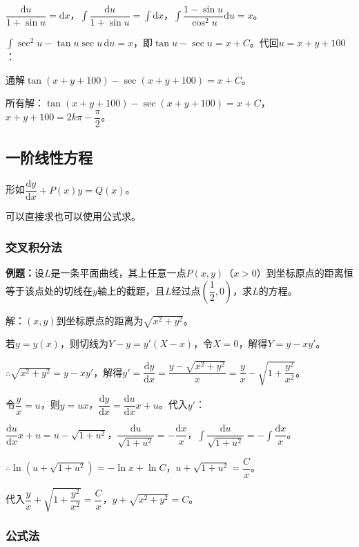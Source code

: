 \documentclass[UTF8, 12pt]{ctexart}
\begin{document}
$\dfrac{\textrm{d}u}{1+\sin u}=\textrm{d}x$，$\displaystyle{\int\dfrac{\textrm{d}u}{1+\sin u}}=\int\textrm{d}x$，$\displaystyle{\int\dfrac{1-\sin u}{\cos^2u}}\textrm{d}u=x$。

$\int\sec^2u-\tan u\sec u\,\textrm{d}u=x$，即$\tan u-\sec u=x+C$。代回$u=x+y+100$：

通解$\tan(x+y+100)-\sec(x+y+100)=x+C$。

所有解：$\tan(x+y+100)-\sec(x+y+100)=x+C$，$x+y+100=2k\pi-\dfrac{\pi}{2}$。

\subsection{一阶线性方程}

形如$\dfrac{\textrm{d}y}{\textrm{d}x}+P(x)y=Q(x)$。

可以直接求也可以使用公式求。

\subsubsection{交叉积分法}

\textbf{例题：}设$L$是一条平面曲线，其上任意一点$P(x,y)$（$x>0$）到坐标原点的距离恒等于该点处的切线在$y$轴上的截距，且$L$经过点$\left(\dfrac{1}{2},0\right)$，求$L$的方程。

解：$(x,y)$到坐标原点的距离为$\sqrt{x^2+y^2}$。

若$y=y(x)$，则切线为$Y-y=y'(X-x)$，令$X=0$，解得$Y=y-xy'$。

$\therefore\sqrt{x^2+y^2}=y-xy'$，解得$y'=\dfrac{\textrm{d}y}{\textrm{d}x}=\dfrac{y-\sqrt{x^2+y^2}}{x}=\dfrac{y}{x}-\sqrt{1+\dfrac{y^2}{x^2}}$。

令$\dfrac{y}{x}=u$，则$y=ux$，$\dfrac{\textrm{d}y}{\textrm{d}x}=\dfrac{\textrm{d}u}{\textrm{d}x}x+u$。代入$y'$：

$\dfrac{\textrm{d}u}{\textrm{d}x}x+u=u-\sqrt{1+u^2}$，$\dfrac{\textrm{d}u}{\sqrt{1+u^2}}=-\dfrac{\textrm{d}x}{x}$，$\displaystyle{\int\dfrac{\textrm{d}u}{\sqrt{1+u^2}}=-\int\dfrac{\textrm{d}x}{x}}$。

$\therefore\ln(u+\sqrt{1+u^2})=-\ln x+\ln C$，$u+\sqrt{1+u^2}=\dfrac{C}{x}$。

代入$\dfrac{y}{x}+\sqrt{1+\dfrac{y^2}{x^2}}=\dfrac{C}{x}$，$y+\sqrt{x^2+y^2}=C$。

\subsubsection{公式法}
\end{document}

